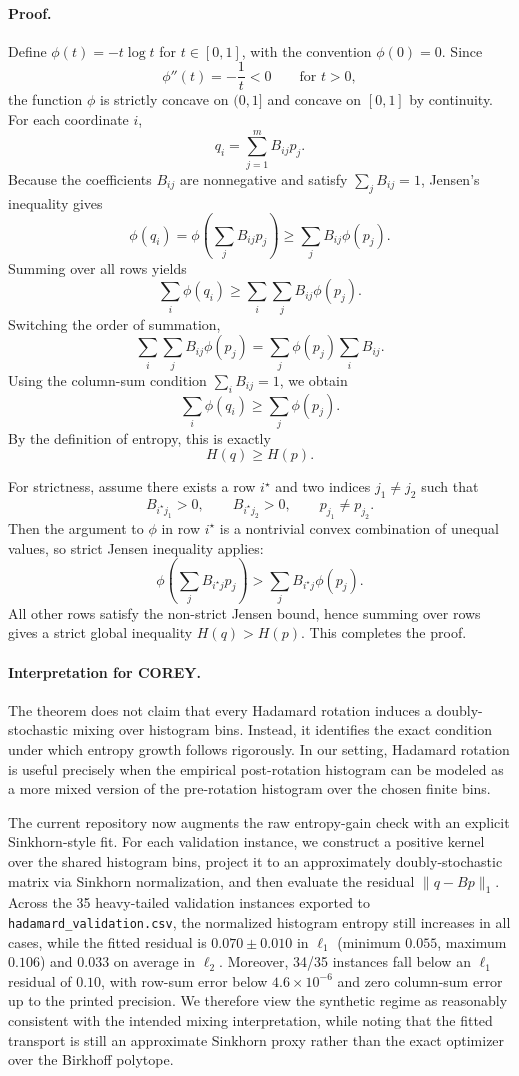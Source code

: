 \paragraph{Proof.}
Define \(\phi(t) = -t \log t\) for \(t \in [0,1]\), with the convention \(\phi(0)=0\). Since
\[
\phi''(t) = -\frac{1}{t} < 0 \qquad \text{for } t>0,
\]
the function \(\phi\) is strictly concave on \((0,1]\) and concave on \([0,1]\) by continuity. For each coordinate \(i\),
\[
q_i = \sum_{j=1}^m B_{ij} p_j.
\]
Because the coefficients \(B_{ij}\) are nonnegative and satisfy \(\sum_j B_{ij}=1\), Jensen's inequality gives
\[
\phi(q_i) = \phi\!\left(\sum_j B_{ij}p_j\right) \ge \sum_j B_{ij}\phi(p_j).
\]
Summing over all rows yields
\[
\sum_i \phi(q_i) \ge \sum_i \sum_j B_{ij}\phi(p_j).
\]
Switching the order of summation,
\[
\sum_i \sum_j B_{ij}\phi(p_j) = \sum_j \phi(p_j) \sum_i B_{ij}.
\]
Using the column-sum condition \(\sum_i B_{ij}=1\), we obtain
\[
\sum_i \phi(q_i) \ge \sum_j \phi(p_j).
\]
By the definition of entropy, this is exactly
\[
H(q) \ge H(p).
\]

For strictness, assume there exists a row \(i^\star\) and two indices \(j_1 \neq j_2\) such that
\[
B_{i^\star j_1} > 0,
\qquad
B_{i^\star j_2} > 0,
\qquad
p_{j_1} \neq p_{j_2}.
\]
Then the argument to \(\phi\) in row \(i^\star\) is a nontrivial convex combination of unequal values, so strict Jensen inequality applies:
\[
\phi\!\left(\sum_j B_{i^\star j}p_j\right) > \sum_j B_{i^\star j}\phi(p_j).
\]
All other rows satisfy the non-strict Jensen bound, hence summing over rows gives a strict global inequality \(H(q)>H(p)\). This completes the proof.

\paragraph{Interpretation for COREY.}
The theorem does not claim that every Hadamard rotation induces a doubly-stochastic mixing over histogram bins. Instead, it identifies the exact condition under which entropy growth follows rigorously. In our setting, Hadamard rotation is useful precisely when the empirical post-rotation histogram can be modeled as a more mixed version of the pre-rotation histogram over the chosen finite bins.

The current repository now augments the raw entropy-gain check with an explicit Sinkhorn-style fit. For each validation instance, we construct a positive kernel over the shared histogram bins, project it to an approximately doubly-stochastic matrix via Sinkhorn normalization, and then evaluate the residual $\lVert q-Bp \rVert_1$. Across the 35 heavy-tailed validation instances exported to \texttt{hadamard\_validation.csv}, the normalized histogram entropy still increases in all cases, while the fitted residual is $0.070 \pm 0.010$ in $\ell_1$ (minimum $0.055$, maximum $0.106$) and $0.033$ on average in $\ell_2$. Moreover, 34/35 instances fall below an $\ell_1$ residual of $0.10$, with row-sum error below $4.6\times 10^{-6}$ and zero column-sum error up to the printed precision. We therefore view the synthetic regime as reasonably consistent with the intended mixing interpretation, while noting that the fitted transport is still an approximate Sinkhorn proxy rather than the exact optimizer over the Birkhoff polytope.

